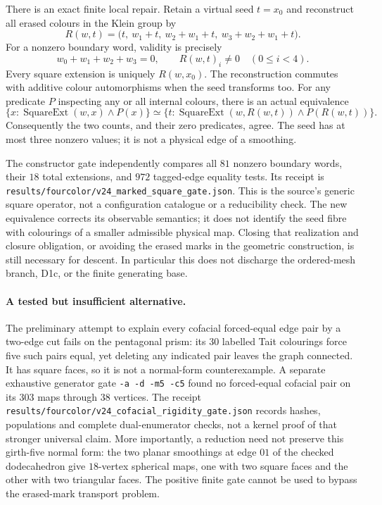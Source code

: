 There is an exact finite local repair. Retain a virtual seed $t=x_0$ and
reconstruct all erased colours in the Klein group by
\[
 R(w,t)=\bigl(t,\ w_1+t,\ w_2+w_1+t,\ w_3+w_2+w_1+t\bigr).
\]
For a nonzero boundary word, validity is precisely
\[
       w_0+w_1+w_2+w_3=0,
       \qquad R(w,t)_i\ne0\quad(0\le i<4).
\]
Every square extension is uniquely $R(w,x_0)$.  The reconstruction
commutes with additive colour automorphisms when the seed transforms too.
For any predicate $P$ inspecting any or all internal colours, there is
an actual equivalence
\[
 \{x:\operatorname{SquareExt}(w,x)\land P(x)\}
 \simeq
 \{t:\operatorname{SquareExt}(w,R(w,t))\land P(R(w,t))\}.
\]
Consequently the two counts, and their zero predicates, agree.  The seed
has at most three nonzero values; it is not a physical edge of a smoothing.

The constructor gate independently compares all $81$ nonzero boundary
words, their $18$ total extensions, and $972$ tagged-edge equality tests.
Its receipt is \texttt{results/fourcolor/v24\_marked\_square\_gate.json}.
This is the source's generic square operator, not a configuration
catalogue or a reducibility check.  The new equivalence corrects its
observable semantics; it does not identify the seed fibre with colourings
of a smaller admissible physical map.  Closing that realization and
closure obligation, or avoiding the erased marks in the geometric
construction, is still necessary for descent.  In particular this does
not discharge the ordered-mesh branch, D1c, or the finite generating base.
\paragraph{A tested but insufficient alternative.}
The preliminary attempt to explain every cofacial forced-equal edge pair
by a two-edge cut fails on the pentagonal prism: its $30$ labelled Tait
colourings force five such pairs equal, yet deleting any indicated pair
leaves the graph connected.  It has square faces, so it is not a
normal-form counterexample.  A separate exhaustive generator gate
\texttt{-a -d -m5 -c5} found no forced-equal cofacial pair on its $303$
maps through $38$ vertices.  The receipt
\texttt{results/fourcolor/v24\_cofacial\_rigidity\_gate.json}
records hashes, populations and complete dual-enumerator checks, not a
kernel proof of that stronger universal claim.  More importantly, a
reduction need not preserve this girth-five normal form: the two planar
smoothings at edge $01$ of the checked dodecahedron give $18$-vertex
spherical maps, one with two square faces and the other with two triangular
faces.  The positive
finite gate cannot be used to bypass the erased-mark transport problem.

